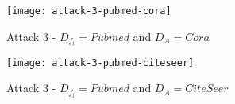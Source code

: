   \begin{figure}[h]
    \begin{center}
        \texttt{[image: attack-3-pubmed-cora]}
        \caption{Attack 3 - $D_{f_t} = Pubmed$ and $D_A = Cora$}
        \label{figure:eval-att3-cora-pubmed}
    \end{center}
  \end{figure}

  \begin{figure}[h]
      \begin{center}
          \texttt{[image: attack-3-pubmed-citeseer]}
          \caption{Attack 3 - $D_{f_t} = Pubmed$ and $D_A = CiteSeer$}
          \label{figure:eval-att3-citeseer-pubmed}
      \end{center}
  \end{figure}